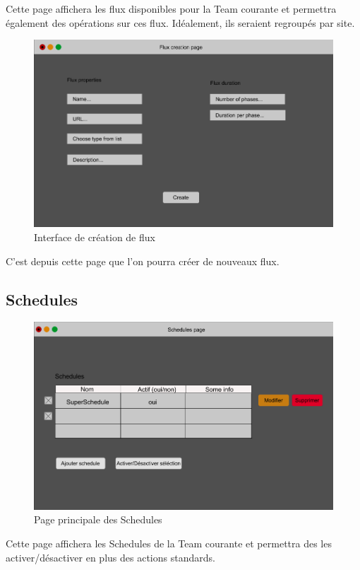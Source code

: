 \documentclass[french]{article}
\begin{document}
\begin{appendices}
	
	Cette page affichera les flux disponibles pour la Team courante et permettra également des opérations sur ces flux. Idéalement, ils seraient regroupés par site.
	
	\begin{figure}[h]
		\centering
		\includegraphics[scale=0.3]{mockup/m_flux_creation}
		\caption{Interface de création de flux}
		\label{fig:fluxCreation}
	\end{figure}
	
	C'est depuis cette page que l'on pourra créer de nouveaux flux.
	
\newpage
\subsection{Schedules}

	\begin{figure}[h]
		\centering
		\includegraphics[scale=0.3]{mockup/m_schedules_page}
		\caption{Page principale des Schedules}
		\label{fig:schedulePage}
	\end{figure}
	Cette page affichera les Schedules de la Team courante et permettra des les activer/désactiver en plus des actions standards.
	

\end{appendices}
\end{document}
